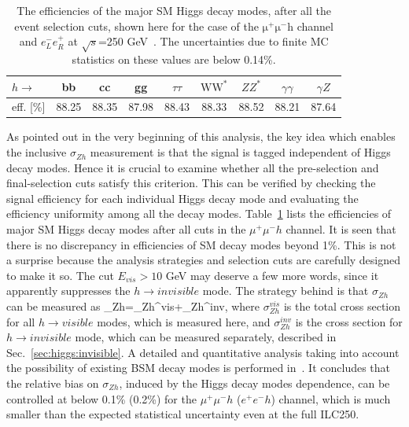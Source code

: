 \begin{table}[htb]
\centering
\begin{tabular}{l|c|c|c|c|c|c|c|c}
\hline
${h\to }$ & bb & cc & gg & $\tau\tau$ & $\mathrm{WW^{*}}$ & 
$ZZ^{*}$ & $\gamma\gamma$ & $\gamma Z$ \\
\hline
eff. [\%] & 88.25 & 88.35 & 87.98 & 88.43 & 88.33 & 88.52 & 88.21 & 87.64 \\
\hline
\end{tabular}
\caption{The efficiencies of the major SM Higgs decay modes,
after all the event selection cuts, shown here for the case 
of the $\mathrm{\mu^{+}\mu^{-}h}$
channel and $e_{L}^{-}e_{R}^{+}$ at $\sqrt{s}$=250 GeV~\cite{Yan:2016xyx}.
The uncertainties due to finite MC statistics on these values are below 0.14\%.}
\label{tab:recoilmass}
\end{table}

As pointed out in the very beginning of this analysis, the key idea which enables
the inclusive $\sigma_{Zh}$ measurement is that the signal is tagged
independent of Higgs decay modes. Hence it is crucial to examine whether all
the pre-selection and final-selection cuts satisfy this criterion. This can be verified 
by checking the signal efficiency for each individual Higgs decay mode
and evaluating the efficiency uniformity among all the decay modes.
Table~\ref{tab:recoilmass} lists the efficiencies of major SM Higgs decay modes 
after all cuts in the $\mu^+\mu^-h$ channel. It is seen that there is no
discrepancy in efficiencies of SM decay modes beyond 1\%. 
This is not a surprise because the analysis strategies and selection cuts
are carefully designed to make it so. The cut $E_{vis}>10$ GeV may
deserve a few more words, since it apparently suppresses the 
$h\to invisible$ mode. The strategy behind is that $\sigma_{Zh}$ can be
measured as 
\beq
\sigma_{Zh}=\sigma_{Zh}^{vis}+\sigma_{Zh}^{inv},
where $\sigma_{Zh}^{vis}$ is the total cross section for all $h\to visible$
modes, which is measured here, and $\sigma_{Zh}^{inv}$ is the cross section
for $h\to invisible$ mode, which can be measured separately, described in
Sec.~\ref{sec:higgs:invisible}. A detailed and quantitative analysis taking into 
account the possibility of existing BSM decay modes is performed in~\cite{Yan:2016xyx}.
It concludes that the relative bias on $\sigma_{Zh}$,
induced by the Higgs decay modes dependence, can be
controlled at below 0.1\% (0.2\%) for the $\mu^+\mu^-h$ ($e^+e^-h$) channel,
which is much smaller than the
expected statistical uncertainty even at the full ILC250.

